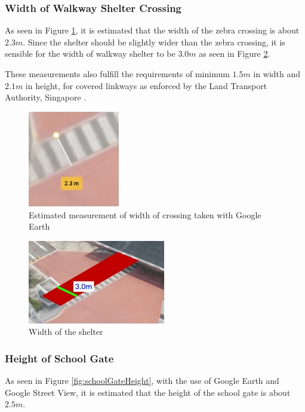 \documentclass[a4paper,titlepage]{article}
\begin{document}
\subsubsection{Width of Walkway Shelter Crossing}

As seen in Figure \ref{fig:crossingWidth}, it is estimated that the width of the zebra crossing is about $2.3\si{m}$. Since the shelter should be slightly wider than the zebra crossing, it is sensible for the width of walkway shelter to be $3.0\si{m}$ as seen in Figure \ref{fig:shelterWidth}.

These measurements also fulfill the requirements of minimum $1.5\si{m}$ in width and $2.1\si{m}$ in height, for covered linkways as enforced by the Land Transport Authority, Singapore \cite{lta-coveredlinkedways}.

\begin{figure}[htbp]
    \centering
    \includegraphics[width=4cm]{crossingWidth.png}
    \caption{Estimated measurement of width of crossing taken with Google Earth}
    \label{fig:crossingWidth}
\end{figure}
\begin{figure}[htbp]
    \centering
    \includegraphics[width=6cm]{shelterWidth.png}
    \caption{Width of the shelter}
    \label{fig:shelterWidth}
\end{figure}

\subsubsection{Height of School Gate}

As seen in Figure \ref{fig:schoolGateHeight}, with the use of Google Earth and Google Street View, it is estimated that the height of the school gate is about $2.5\si{m}$.
\end{document}
